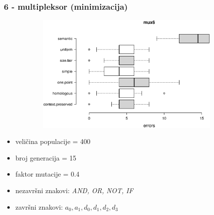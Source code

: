 \documentclass{beamer}
\begin{document}
\begin{frame}
\frametitle{6 - multipleksor (minimizacija)}


\begin{figure}[!htb]
\begin{figure}[H]
	\centering
	\includegraphics[trim=3cm 6cm 0cm 3.5cm, scale=0.3]{./boxPlots/mux6.eps}
\end{figure}
\endminipage
{}
\endminipage
\end{figure}

\begin{itemize}
\item{veličina populacije = 400}
\item{broj generacija = 15}
\item{faktor mutacije = 0.4}
\item{nezavršni znakovi: \textit{AND, OR, NOT, IF}}
\item{završni znakovi: \textit{$a_0, a_1, d_0, d_1, d_2, d_3$}}
\end{itemize}
\end{frame}
\end{document}
